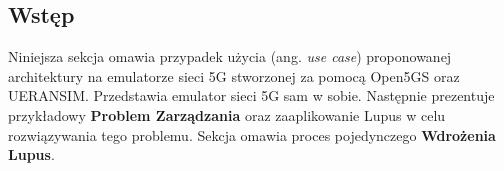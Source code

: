 \subsection{Wstęp}

Niniejsza sekcja omawia przypadek użycia (ang. \textit{use case}) proponowanej architektury na emulatorze sieci 5G stworzonej za pomocą Open5GS oraz UERANSIM. Przedstawia emulator sieci 5G sam w sobie. Następnie prezentuje przykładowy \textbf{Problem Zarządzania} oraz zaaplikowanie Lupus w celu rozwiązywania tego problemu. Sekcja omawia proces pojedynczego \textbf{Wdrożenia Lupus}. 